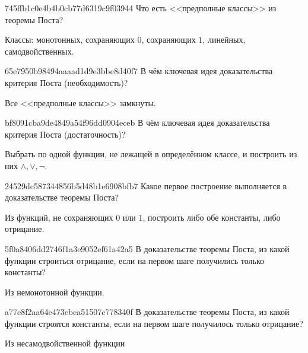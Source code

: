 \begin{note}{745ffb1c0e4b4b0cb77d6319c9f03944}
    Что есть <<предполные классы>> из теоремы Поста?

    \begin{cloze}{1}
        Классы: монотонных, сохраняющих \({ 0 }\), сохраняющих \({ 1 }\), линейных, самодвойственных.
    \end{cloze}
\end{note}

\begin{note}{65e7950b98494aaaad1d9e3bbe8d40f7}
    В чём ключевая идея доказательства критерия Поста (необходимость)?

    \begin{cloze}{1}
        Все <<предполные классы>> замкнуты.
    \end{cloze}
\end{note}

\begin{note}{bf8091cba9de4849a54f96dd0904eceb}
    В чём ключевая идея доказательства критерия Поста (достаточность)?

    \begin{cloze}{1}
        Выбрать по одной функции, не лежащей в определённом классе, и построить из них \({ \land, \lor, \lnot }\).
    \end{cloze}
\end{note}

\begin{note}{24529dc587344856b5d48b1e6908bfb7}
    Какое первое построение выполняется в доказательстве теоремы Поста?

    \begin{cloze}{1}
        Из функций, не сохраняющих \({ 0 }\) или \({ 1 }\), построить либо обе константы, либо отрицание.
    \end{cloze}
\end{note}

\begin{note}{5f0a8406dd2746f1a3e9052ef61a42a5}
    В доказательстве теоремы Поста, из какой функции строиться отрицание, если на первом шаге получились только константы?

    \begin{cloze}{1}
        Из немонотонной функции.
    \end{cloze}
\end{note}

\begin{note}{a77e8f2aa64e473cbca51507c778340f}
    В доказательстве теоремы Поста, из какой функции строятся константы, если на первом шаге получилось только отрицание?

    \begin{cloze}{1}
        Из несамодвойственной функции
    \end{cloze}
\end{note}

